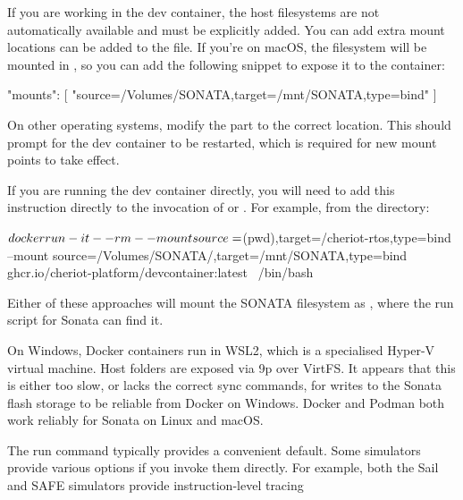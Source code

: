 If you are working in the dev container, the host filesystems are not automatically available and must be explicitly added.
You can add extra mount locations can be added to the  file.
If you're on macOS, the  filesystem will be mounted in , so you can add the following snippet to expose it to the container:
\begin{jsonsnippet}
  "mounts": [
    "source=/Volumes/SONATA,target=/mnt/SONATA,type=bind"
  ]
\end{jsonsnippet}

On other operating systems, modify the  part to the correct location.
This should prompt for the dev container to be restarted, which is required for new mount points to take effect.

If you are running the dev container directly, you will need to add this instruction directly to the invocation of  or .
For example, from the  directory:

\begin{console}
$ docker run -it --rm \\
	--mount source=$(pwd),target=/cheriot-rtos,type=bind \\
	--mount source=/Volumes/SONATA/,target=/mnt/SONATA,type=bind \\
	ghcr.io/cheriot-platform/devcontainer:latest \
	/bin/bash
\end{console}

Either of these approaches will mount the SONATA filesystem as , where the run script for Sonata can find it.

\begin{caution}
	On Windows, Docker containers run in WSL2, which is a specialised Hyper-V virtual machine.
	Host folders are exposed via 9p over VirtFS.
	It appears that this is either too slow, or lacks the correct sync commands, for writes to the Sonata flash storage to be reliable from Docker on Windows.
	Docker and Podman both work reliably for Sonata on Linux and macOS.
\end{caution}

The run command typically provides a convenient default.
Some simulators provide various options if you invoke them directly.
For example, both the Sail and SAFE simulators provide instruction-level tracing

